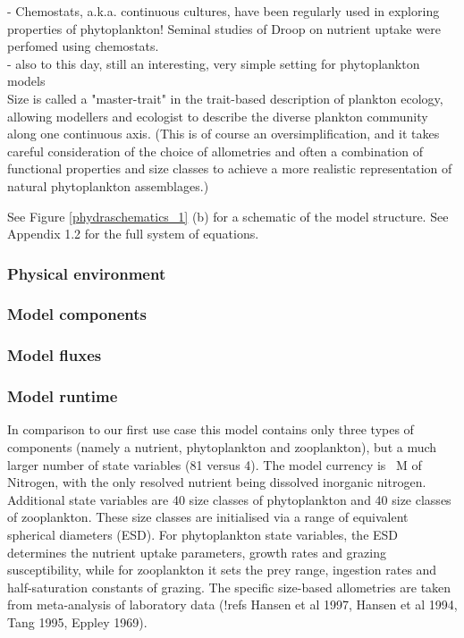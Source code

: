 \documentclass[template.tex]{subfiles}
\begin{document}
- Chemostats, a.k.a. continuous cultures, have been regularly used in exploring properties of phytoplankton! Seminal studies of Droop on nutrient uptake were perfomed using chemostats. \citep{Droop1968VitaminLutheri} \\
- also to this day, still an interesting, very simple setting for phytoplankton models\\

Size is called a "master-trait" in the trait-based description of plankton ecology, allowing modellers and ecologist to describe the diverse plankton community along one continuous axis. (This is of course an oversimplification, and it takes careful consideration of the choice of allometries and often a combination of functional properties and size classes to achieve a more realistic representation of natural phytoplankton assemblages.)

See Figure \ref{phydraschematics_1} (b) for a schematic of the model structure. See Appendix 1.2 for the full system of equations.

\subsubsection{Physical environment}
\subsubsection{Model components}

\subsubsection{Model fluxes}

\subsubsection{Model runtime}

In comparison to our first use case this model contains only three types of components (namely a nutrient, phytoplankton and zooplankton), but a much larger number of state variables (81 versus 4). The model currency is \unit{\mu M} of Nitrogen, with the only resolved nutrient being dissolved inorganic nitrogen. Additional state variables are 40 size classes of phytoplankton and 40 size classes of zooplankton. These size classes are initialised via a range of equivalent spherical diameters (ESD). For phytoplankton state variables, the ESD determines the nutrient uptake parameters, growth rates and grazing susceptibility, while for zooplankton it sets the prey range, ingestion rates and half-saturation constants of grazing. The specific size-based allometries are taken from meta-analysis of laboratory data (!refs Hansen et al 1997, Hansen et al 1994, Tang 1995, Eppley 1969). 
\end{document}
